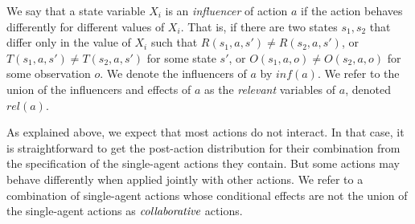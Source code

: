 \documentclass[letterpaper]{article} %
\theoremstyle{definition}
\newcommand{\eliran}[1]{\textbf{[\color{red}ELIRAN:#1]}}
\newcommand{\ronen}[1]{\textbf{[\color{blue}RONEN:#1]}}
\begin{document}
We say that a state variable $X_i$ is an
{\em influencer} of action $a$ if the action behaves differently for different values of $X_i$. That is, if there are two states $s_1,s_2$ that differ only in the value of $X_i$ such that $R(s_1,a,s')\neq R(s_2,a,s')$, or $T(s_1,a,s')\neq T(s_2,a,s')$ for some state $s'$, or $O(s_1,a,o)\neq O(s_2,a,o)$ for some observation $o$.
We denote the influencers of $a$ by
$inf(a)$.
We refer to the union of the influencers and effects of $a$ as
the {\em relevant} variables of $a$,
denoted $rel(a)$.


As explained above, we expect that most actions do not interact. In that case, it is straightforward to get the post-action distribution for their combination from the specification of the single-agent actions they contain. But some actions may behave differently when applied jointly with other actions. We refer to a combination of single-agent actions whose conditional effects are not the union of the single-agent actions as $\emph{collaborative}$ actions. 
\end{document}
